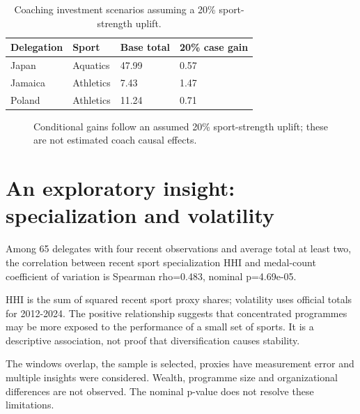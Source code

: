 \documentclass[11pt,a4paper]{article}
\begin{document}
\begin{table}[htbp]
\centering
\caption{Coaching investment scenarios assuming a 20\% sport-strength uplift.}
\label{tab:5}
\small
\begin{tabular}{@{}L{5.119cm} R{3.312cm} R{3.312cm} R{3.312cm}@{}}
\toprule
Delegation & Sport & Base total & 20\% case gain\\
\midrule
Japan & Aquatics & 47.99 & 0.57\\
Jamaica & Athletics & 7.43 & 1.47\\
Poland & Athletics & 11.24 & 0.71\\
\bottomrule
\end{tabular}
\par{}
\end{table}
\begin{figure}[htbp]
\centering
\begin{center}\end{center}

\caption{Conditional gains follow an assumed 20\% sport-strength uplift; these are not estimated coach causal effects.}
\label{fig:5}
\end{figure}
\section{An exploratory insight: specialization and volatility}
Among 65 delegates with four recent observations and average total at least two, the correlation between recent sport specialization HHI and medal-count coefficient of variation is Spearman rho=0.483, nominal p=4.69e-05.

HHI is the sum of squared recent sport proxy shares; volatility uses official totals for 2012-2024. The positive relationship suggests that concentrated programmes may be more exposed to the performance of a small set of sports. It is a descriptive association, not proof that diversification causes stability.

The windows overlap, the sample is selected, proxies have measurement error and multiple insights were considered. Wealth, programme size and organizational differences are not observed. The nominal p-value does not resolve these limitations.
\end{document}
